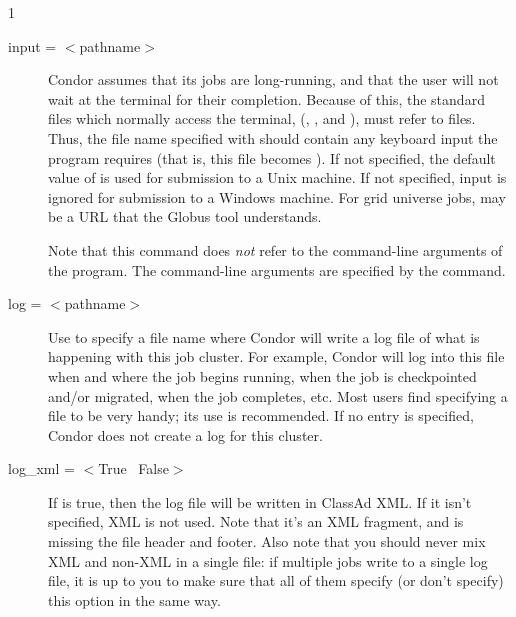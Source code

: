 \begin{ManPage}{\label{man-condor-submit}}{1}
\begin{description}

\item[input = $<$pathname$>$]
Condor assumes that its jobs are
long-running, and that the user will not wait at the terminal for their
completion. Because of this, the standard files which normally access
the terminal, (, , and ),
must refer to files. Thus,
the file name specified with  should contain any keyboard
input the program requires (that is, this file becomes ).
If not specified, the default value
of  is used for submission to a Unix machine.
If not specified, input is ignored
for submission to a Windows machine.
For grid universe jobs,  may be a URL that the Globus
tool  understands.

Note that this command does \emph{not} refer to the command-line
arguments of the program.  The command-line arguments are specified by
the  command.


\item[log = $<$pathname$>$] Use  to specify a file name where
Condor will write a log file of what is happening with this job cluster.
For example, Condor will log into this file when and where the job
begins running, when the job is checkpointed and/or migrated, when the
job completes, etc. Most users find specifying a  file to be very
handy; its use is recommended. If no  entry is specified, 
Condor does not create a log for this cluster.


\item[log\_xml = $<$True \Bar\ False$>$]
If  is true, 
then the log file will be written in ClassAd XML. If it isn't
specified, XML is not used. Note that it's an XML fragment, and is
missing the file header and footer. Also note that you should never
mix XML and non-XML in a single file: if multiple jobs write to a
single log file, it is up to you to make sure that all of them specify
(or don't specify) this option in the same way.



\end{description}
\end{ManPage}

